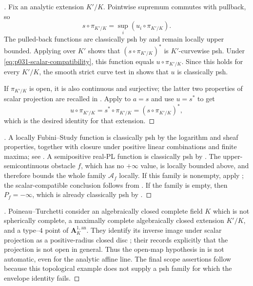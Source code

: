 \begin{proof}[
]
Fix an analytic extension $K'/K$.  Pointwise supremum commutes with
pullback, so
\[
             s\circ\pi_{K'/K}=\sup_i(u_i\circ\pi_{K'/K}).
\]
The pulled-back functions are classically psh by
\cite[Proposition~4.2(5)]{GR25Classical} and remain locally upper bounded.
Applying  over $K'$ shows
that $(s\circ\pi_{K'/K})^*$ is $K'$-curvewise psh.  Under
\eqref{eq:p031-scalar-compatibility}, this function equals
$u\circ\pi_{K'/K}$.  Since this holds for every $K'/K$, the smooth
strict curve test in \cite[Definition~4.1 and \S4.1.3]{GR25Classical}
shows that $u$ is classically psh.

If $\pi_{K'/K}$ is open, it is also continuous and surjective; the latter
two properties of scalar projection are recalled in
\cite[\S2.9]{GR25Classical}.  Apply
 to $a=s$ and use $u=s^*$ to get
\[
 u\circ\pi_{K'/K}
   =s^*\circ\pi_{K'/K}
   =(s\circ\pi_{K'/K})^*,
\]
which is the desired identity for that extension.
\end{proof}

\begin{proof}[
]
A locally Fubini--Study function is classically psh by the logarithm and
sheaf properties, together with closure under positive linear combinations
and finite maxima; see
\cite[Proposition~4.2(1)--(3)]{GR25Classical}.  A semipositive real-PL
function is classically psh by \cite[Theorem~4.3]{GR25Classical}.  The
upper-semicontinuous obstacle $f$, which has no $+\infty$ value, is
locally bounded above, and therefore bounds the whole family
$\mathcal A_f$ locally.  If this family is nonempty, apply
; the scalar-compatible
conclusion follows from
.  If the family is empty,
then $P_f=-\infty$, which is already classically psh by
\cite[Definitions~3.4 and~4.1]{GR25Classical}.
\end{proof}

\begin{proof}[
]
Poineau--Turchetti consider an algebraically closed complete field $K$
which is not spherically complete, a maximally complete algebraically
closed extension $K'/K$, and a type--$4$ point of
$\mathbf A_K^{1,\mathrm{an}}$.  They identify its inverse image under
scalar projection as a positive-radius closed disc
\cite[Lemma~5.6.2]{PT21SchottkyI}; their
\cite[Remark~5.6.4]{PT21SchottkyI} records explicitly that the projection
is not open in general.  Thus the open-map hypothesis in
 is not automatic, even for the
analytic affine line.  The final scope assertions follow because this
topological example does not supply a psh family for which the envelope
identity fails.
\end{proof}
